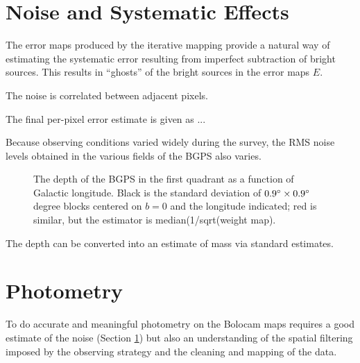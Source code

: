 \documentclass[12pt,preprint]{aastex}
\def\Figure#1#2#3#4{
\begin{figure}[htb]
\epsscale{#4}
\plotone{#1}
\caption{#2}
\label{#3}
\end{figure}
}
\begin{document}

\section{Noise and Systematic Effects}
\label{sec:Noise}

The error maps produced by the iterative mapping provide a natural way
of estimating the systematic error resulting from imperfect
subtraction of bright sources.  This results in ``ghosts'' of the
bright sources in the error maps $E$.  


The noise is correlated between adjacent pixels.  

The final per-pixel error estimate is given as ...

Because observing conditions varied widely during the survey, the RMS
noise levels obtained in the various fields of the BGPS also varies.  

\Figure{survey_depth}{The depth of the BGPS in the first quadrant
as a function of Galactic longitude.  Black is the standard deviation
of $0.9\mbox{$^\circ$} \times 0.9\mbox{$^\circ$}$ degree blocks centered on $b=0$ and
the longitude indicated; red is similar, but the estimator is
median(1/sqrt(weight map).}{fig:Depth}{1.0}

The depth can be converted into an estimate of mass via standard
estimates.

\section{Photometry}

To do accurate and meaningful photometry on the Bolocam maps requires
a good estimate of the noise (Section \ref{sec:Noise}) but also an
understanding of the spatial filtering imposed by the observing
strategy and the cleaning and mapping of the data.
\end{document}

